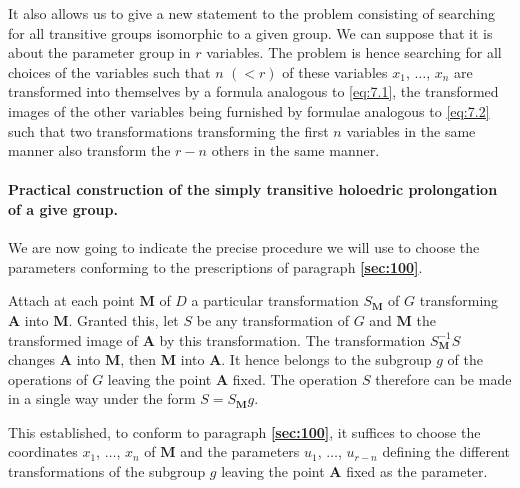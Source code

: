 \documentclass[leqno,11pt]{book}
\numberwithin{equation}{chapter}
\theoremstyle{shape1}
\theoremstyle{shapesmall}
\newcommand{\fsref}[1]{{\rm\textsection\textbf{\ref{sec:#1}}}}
\begin{document}
It also allows us to give a new statement to the problem consisting of searching for all transitive groups isomorphic to a given group. We can suppose that it is about the parameter group in $r$ variables. The problem is hence searching for all choices of the variables such that $n$ $(<r)$ of these variables $x_{1}$, $\dots$, $x_{n}$ are transformed into themselves by a formula analogous to \eqref{eq:7.1}, the transformed images of the other variables being furnished by formulae analogous to \eqref{eq:7.2} such that two transformations transforming the first $n$ variables in the same manner also transform the $r-n$ others in the same manner.


\paragraph{Practical construction of the simply transitive holoedric prolongation of a give group.}
\label{sec:101}
We are now going to indicate the precise procedure we will use to choose the parameters conforming to the prescriptions of paragraph \fsref{100}.

Attach at each point $\mathbf{M}$ of $D$ a particular transformation $S_{\mathbf{M}}$ of $G$ transforming $\mathbf{A}$ into $\mathbf{M}$. Granted this, let $S$ be any transformation of $G$ and $\mathbf{M}$ the transformed image of $\mathbf{A}$ by this transformation. The transformation $S_{\mathbf{M}}^{-1}S$ changes $\mathbf{A}$ into $\mathbf{M}$, then $\mathbf{M}$ into $\mathbf{A}$. It hence belongs to the subgroup $g$ of the operations of $G$ leaving the point $\mathbf{A}$ fixed. The operation $S$ therefore can be made in a single way under the form $S=S_{\mathbf{M}}g$.

This established, to conform to paragraph \fsref{100}, it suffices to choose the coordinates $x_{1}$, $\dots$, $x_{n}$ of $\mathbf{M}$ and the parameters $u_{1}$, $\dots$, $u_{r-n}$ defining the different transformations of the subgroup $g$ leaving the point $\mathbf{A}$ fixed as the parameter.
\end{document}
